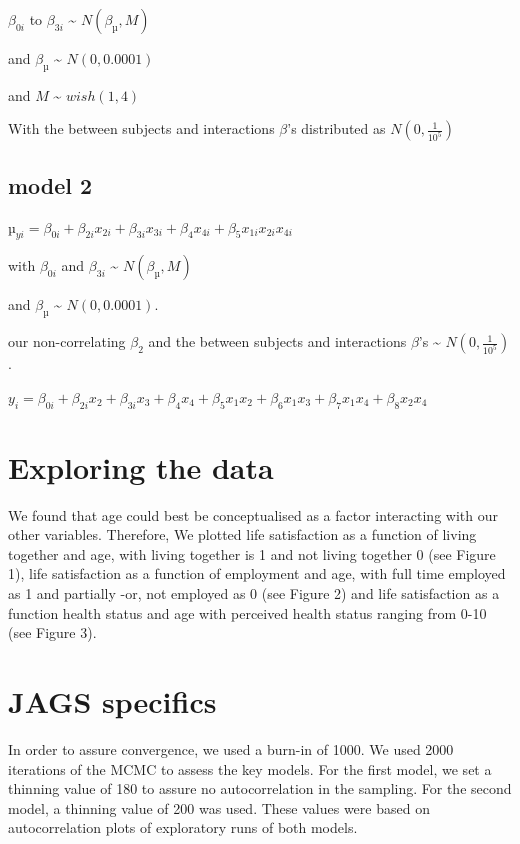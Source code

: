 \documentclass[man]{apa6}
\theoremstyle{definition}
\theoremstyle{definition}
\theoremstyle{definition}
\theoremstyle{remark}
\begin{document}
\({\beta_{0i}}\) to \({\beta_{3i}}\) \textasciitilde{}
\({ N(\beta_{µ} , M ) }\)

and \({\beta_{µ}}\) \textasciitilde{} \({N(0, 0.0001)}\)

and \({M}\) \textasciitilde{} \({wish(1,4)}\)

With the between subjects and interactions \(\beta\)'s distributed as
\({N(0, \frac {1}{10^5})}\)

\hypertarget{model-2}{%
\subsection{model 2}\label{model-2}}

\({µ_{yi} = \beta_{0i} + \beta_{2i}x_{2i} + \beta_{3i}x_{3i} +\beta_{4}x_{4i} + \beta_{5}x_{1i}x_{2i}x_{4i}}\)

with \({\beta_{0i}}\) and \({\beta_{3i}}\) \textasciitilde{}
\({ N(\beta_{µ} , M ) }\)

and \({\beta_{µ}}\) \textasciitilde{} \({N(0, 0.0001)}\).

our non-correlating \(\beta_{2}\) and the between subjects and
interactions \(\beta\)'s \textasciitilde{} \({N(0, \frac {1}{10^5})}\).

\({y_{i} = \beta_{0i} + \beta_{2i}x_{2} + \beta_{3i}x_{3} +\beta_{4}x_{4} + \beta_{5}x_{1}x_{2} + \beta_{6}x_{1}x_{3} + \beta_{7}x_{1}x_{4}+\beta_{8}x_{2}x_{4} }\)

\hypertarget{exploring-the-data}{%
\section{Exploring the data}\label{exploring-the-data}}

We found that age could best be conceptualised as a factor interacting
with our other variables. Therefore, We plotted life satisfaction as a
function of living together and age, with living together is 1 and not
living together 0 (see Figure 1), life satisfaction as a function of
employment and age, with full time employed as 1 and partially -or, not
employed as 0 (see Figure 2) and life satisfaction as a function health
status and age with perceived health status ranging from 0-10 (see
Figure 3).

\hypertarget{jags-specifics}{%
\section{JAGS specifics}\label{jags-specifics}}

In order to assure convergence, we used a burn-in of 1000. We used 2000
iterations of the MCMC to assess the key models. For the first model, we
set a thinning value of 180 to assure no autocorrelation in the
sampling. For the second model, a thinning value of 200 was used. These
values were based on autocorrelation plots of exploratory runs of both
models.
\end{document}
